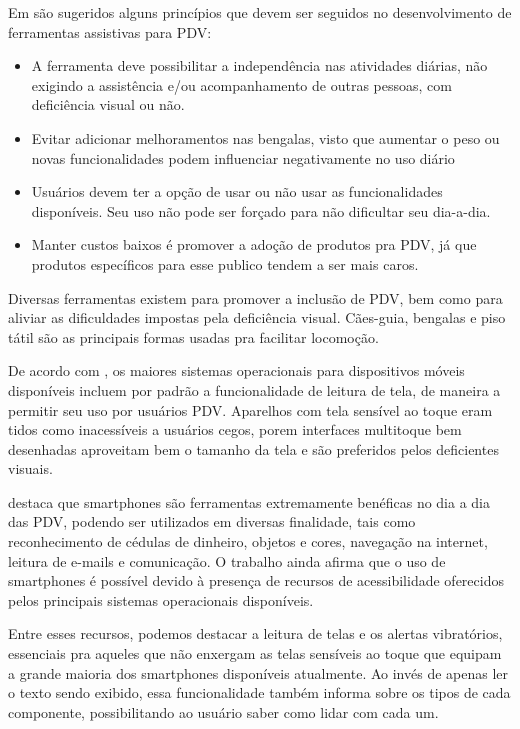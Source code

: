 \documentclass[english,brazilian]{UNISINOSmonografia}
\begin{document}
Em  são sugeridos alguns princípios que devem ser seguidos no desenvolvimento de ferramentas assistivas para PDV:
\begin{itemize}
	\item A ferramenta deve possibilitar a independência nas atividades diárias, não exigindo a assistência e/ou acompanhamento de outras pessoas, com deficiência visual ou não.
	\item Evitar adicionar melhoramentos nas bengalas, visto que aumentar o peso ou novas funcionalidades podem influenciar negativamente no uso diário
	\item Usuários devem ter a opção de usar ou não usar as funcionalidades disponíveis. Seu uso não pode ser forçado para não dificultar seu dia-a-dia.
	\item Manter custos baixos é promover a adoção de produtos pra PDV, já que produtos específicos para esse publico tendem a ser mais caros.
\end{itemize}


Diversas ferramentas existem para promover a inclusão de PDV, bem como para aliviar as dificuldades impostas pela deficiência visual. Cães-guia, bengalas e piso tátil são as principais formas usadas pra facilitar locomoção.


De acordo com , os maiores sistemas operacionais para dispositivos móveis disponíveis incluem por padrão a funcionalidade de leitura de tela, de maneira a permitir seu uso por usuários PDV. Aparelhos com tela sensível ao toque eram tidos como inacessíveis a usuários cegos, porem interfaces multitoque bem desenhadas aproveitam bem o tamanho da tela e são preferidos pelos deficientes visuais.

 destaca que smartphones são ferramentas extremamente benéficas no dia a dia das PDV, podendo ser utilizados em diversas finalidade, tais como reconhecimento de cédulas de dinheiro, objetos e cores, navegação na internet, leitura de e-mails e comunicação. O trabalho ainda afirma que o uso de smartphones é possível devido à presença de recursos de acessibilidade oferecidos pelos principais sistemas operacionais disponíveis. 

Entre esses recursos, podemos destacar a leitura de telas e os alertas vibratórios, essenciais pra aqueles que não enxergam as telas sensíveis ao toque que equipam a grande maioria dos smartphones disponíveis atualmente. Ao invés de apenas ler o texto sendo exibido, essa funcionalidade também informa sobre os tipos de cada componente, possibilitando ao usuário saber como lidar com cada um.
\end{document}

